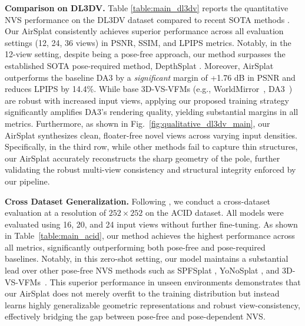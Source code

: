 \noindent \textbf{Comparison on DL3DV.}
Table \ref{table:main_dl3dv} reports the quantitative NVS performance on the DL3DV dataset compared to recent SOTA methods \cite{chen2024mvsplat, xu2025depthsplat, ye2024no, jiang2025anysplat, liu2025worldmirror, ye2026yonosplat}. 
Our AirSplat consistently achieves superior performance across all evaluation settings (12, 24, 36 views) in PSNR, SSIM, and LPIPS metrics.
Notably, in the 12-view setting, despite being a pose-free approach, our method surpasses the established SOTA pose-required method, DepthSplat \cite{xu2025depthsplat}. 
Moreover, AirSplat outperforms the baseline DA3 by a \textit{significant} margin of {+1.76 dB} in PSNR and reduces LPIPS by 14.4\%. 
While base 3D-VS-VFMs (e.g., WorldMirror~\cite{liu2025worldmirror}, DA3~\cite{lin2025da3}) are robust with increased input views, applying our proposed training strategy significantly amplifies DA3's rendering quality, yielding substantial margins in all metrics. 
Furthermore, as shown in Fig.~\ref{fig:qualitative_dl3dv_main}, our AirSplat synthesizes clean, floater-free novel views across varying input densities.
Specifically, in the third row, while other methods fail to capture thin structures, our AirSplat accurately reconstructs the sharp geometry of the pole, further validating the robust multi-view consistency and structural integrity enforced by our pipeline.

\begin{table}[t]
\begin{center}
    \scriptsize
    \caption{Cross-dataset generalization performance under various input-view settings. We evaluate the zero-shot performance on the ACID dataset~\cite{infinite_nature_2020}.}
    \vspace{-3mm}
    \resizebox{\linewidth}{!}{ 
        
    }
\label{table:main_acid}
\end{center}
\end{table}

\noindent \textbf{Cross Dataset Generalization.}
Following \cite{huang2025no, park2026ecosplat}, we conduct a cross-dataset evaluation at a resolution of $252\times252$ on the ACID dataset. 
All models were evaluated using 16, 20, and 24 input views without further fine-tuning. 
As shown in Table~\ref{table:main_acid}, our method achieves the highest performance across all metrics, significantly outperforming both pose-free and pose-required baselines.
Notably, in this zero-shot setting, our model maintains a substantial lead over other pose-free NVS methods such as SPFSplat \cite{huang2025no}, YoNoSplat \cite{ye2026yonosplat}, and 3D-VS-VFMs~\cite{liu2025worldmirror, lin2025da3}.
This superior performance in unseen environments demonstrates that our AirSplat does not merely overfit to the training distribution but instead learns highly generalizable geometric representations and robust view-consistency, effectively bridging the gap between pose-free and pose-dependent NVS.

